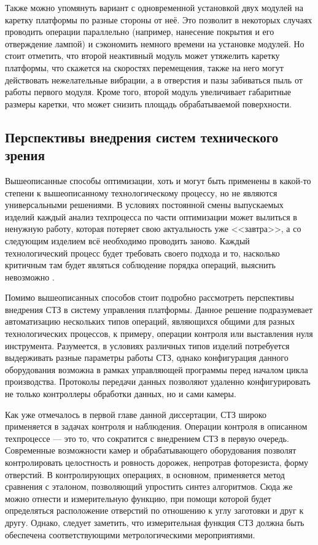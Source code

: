 Также можно упомянуть вариант с одновременной установкой двух модулей на каретку платформы по разные стороны от неё. Это позволит в некоторых случаях проводить операции параллельно (например, нанесение покрытия и его отверждение лампой) и сэкономить немного времени на установке модулей. Но стоит отметить, что второй неактивный модуль может утяжелить каретку платформы, что скажется на скоростях перемещения, также на него могут действовать нежелательные вибрации, а в отверстия и пазы забиваться пыль от работы первого модуля. Кроме того, второй модуль увеличивает габаритные размеры каретки, что может снизить площадь обрабатываемой поверхности.

\subsection{Перспективы внедрения систем технического зрения} \label{ssect2_4_2}

Вышеописанные способы оптимизации, хоть и могут быть применены в какой-то степени к вышеописанному технологическому процессу, но не являются универсальными решениями. В условиях постоянной смены выпускаемых изделий каждый анализ техпроцесса по части оптимизации может вылиться в ненужную работу, которая потеряет свою актуальность уже <<завтра>>, а со следующим изделием всё необходимо проводить заново. Каждый технологический процесс будет требовать своего подхода и то, насколько критичным там будет являться соблюдение порядка операций, выяснить невозможно \cite{Pisarevsky}.

Помимо вышеописанных способов стоит подробно рассмотреть перспективы внедрения СТЗ в систему управления платформы. Данное решение подразумевает автоматизацию нескольких типов операций, являющихся общими для разных технологических процессов, к примеру, операции контроля или выставления нуля инструмента. Разумеется, в условиях различных типов изделий потребуется выдерживать разные параметры работы СТЗ, однако конфигурация данного оборудования возможна в рамках управляющей программы перед началом цикла производства. Протоколы передачи данных позволяют удаленно конфигурировать не только контроллеры обработки данных, но и сами камеры.

Как уже отмечалось в первой главе данной диссертации, СТЗ широко применяется в задачах контроля и наблюдения. Операции контроля в описанном техпроцессе --- это то, что сократится с внедрением СТЗ в первую очередь. Современные возможности камер и обрабатывающего оборудования позволят контролировать целостность и ровность дорожек, непротрав фоторезиста, форму отверстий. В контролирующих операциях, в основном, применяется метод сравнения с эталоном, позволяющий упростить синтез алгоритмов. Сюда же можно отнести и измерительную функцию, при помощи которой будет определяться расположение отверстий по отношению к углу заготовки и друг к другу. Однако, следует заметить, что измерительная функция СТЗ должна быть обеспечена соответствующими метрологическими мероприятиями.


